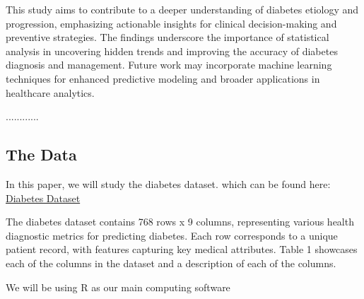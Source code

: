 \documentclass[12pt]{article}
\begin{document}
This study aims to contribute to a deeper understanding of diabetes etiology and progression, emphasizing actionable insights for clinical decision-making and preventive strategies. The findings underscore the importance of statistical analysis in uncovering hidden trends and improving the accuracy of diabetes diagnosis and management. Future work may incorporate machine learning techniques for enhanced predictive modeling and broader applications in healthcare analytics.

............
\subsection{The Data}

In this paper, we will study the diabetes dataset. \cite{Kaggles} which can be found here: \href{https://www.kaggle.com/datasets/hasibur013/diabetes-dataset}{Diabetes Dataset}

The diabetes dataset contains 768 rows x 9 columns, representing various health diagnostic metrics for predicting diabetes. Each row corresponds to a unique patient record, with features capturing key medical attributes. Table 1 showcases each of the columns in the dataset and a description of each of the columns.

We will be using R \cite{Rlang} as our main computing software

\begin{table}[h!]
	\centering
	\caption{Description of the Diabetes Dataset}
\end{table}
\end{document}
